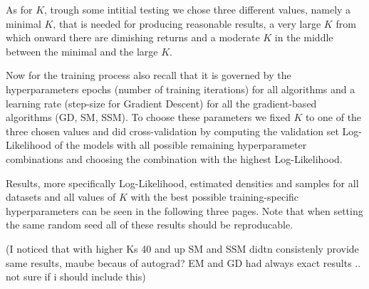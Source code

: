 As for $K$, trough some intitial testing we chose three different values, namely a minimal $K$, that is needed for producing reasonable results, 
a very large $K$ from which onward there are dimishing returns and a moderate $K$ in the middle between the minimal and the large $K$.

Now for the training process also recall that it is governed by the hyperparameters epochs (number of training iterations) for all algorithms and 
a learning rate (step-size for Gradient Descent) for all the gradient-based algorithms (GD, SM, SSM).
To choose these parameters we fixed $K$ to one of the three chosen values and did cross-validation by computing the validation set Log-Likelihood 
of the models with all possible remaining hyperparameter combinations and choosing the combination with the highest Log-Likelihood.

Results, more specifically Log-Likelihood, estimated densities and samples for all datasets and all values of $K$ with the best possible training-specific 
hyperparameters can be seen in the following three pages. Note that when setting the same random seed all of these results should be 
reproducable.

(I noticed that with higher Ks 40 and up SM and SSM didtn consistenly provide same results, maube becaus of autograd? EM and GD had 
always exact results .. not sure if i should include this)

